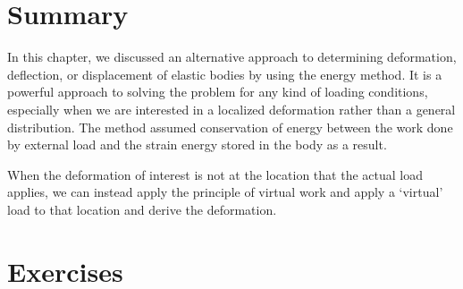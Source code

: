 \documentclass[
10pt,
a4paper,
openany,
svgnames,
]{kaobook} %
\begin{document}
\section*{Summary}

In this chapter, we discussed an alternative approach to determining deformation, deflection, or displacement of elastic bodies by using the energy method. It is a powerful approach to solving the problem for any kind of loading conditions, especially when we are interested in a localized deformation rather than a general distribution. The method assumed conservation of energy between the work done by external load and the strain energy stored in the body as a result.

When the deformation of interest is not at the location that the actual load applies, we can instead apply the principle of virtual work and apply a `virtual' load to that location and derive the deformation.

\section*{Exercises}
\end{document}
